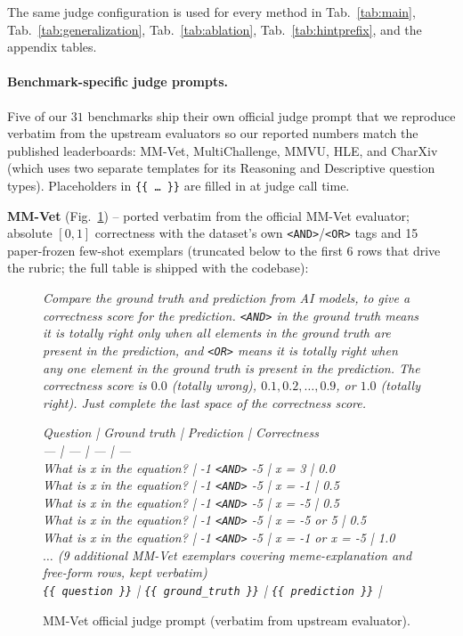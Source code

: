 The same judge configuration is used for every method in Tab.~\ref{tab:main}, Tab.~\ref{tab:generalization}, Tab.~\ref{tab:ablation}, Tab.~\ref{tab:hintprefix}, and the appendix tables.

\paragraph{Benchmark-specific judge prompts.}
Five of our $31$ benchmarks ship their own official judge prompt that we reproduce verbatim from the upstream evaluators so our reported numbers match the published leaderboards: MM-Vet, MultiChallenge, MMVU, HLE, and CharXiv (which uses two separate templates for its Reasoning and Descriptive question types). Placeholders in \texttt{\{\{\,\dots\,\}\}} are filled in at judge call time.

\textbf{MM-Vet} (Fig.~\ref{fig:prompt-judge-mmvet}) -- ported verbatim from the official MM-Vet evaluator; absolute $[0,1]$ correctness with the dataset's own \texttt{<AND>}/\texttt{<OR>} tags and 15 paper-frozen few-shot exemplars (truncated below to the first 6 rows that drive the rubric; the full table is shipped with the codebase):
\begin{figure}[!htbp]
\begin{prompttemplatefig}
\small
\emph{Compare the ground truth and prediction from AI models, to give a correctness score for the prediction. \texttt{<AND>} in the ground truth means it is totally right only when all elements in the ground truth are present in the prediction, and \texttt{<OR>} means it is totally right when any one element in the ground truth is present in the prediction. The correctness score is $0.0$ (totally wrong), $0.1, 0.2, \dots, 0.9$, or $1.0$ (totally right). Just complete the last space of the correctness score.}

\emph{Question | Ground truth | Prediction | Correctness}\\
\emph{--- | --- | --- | ---}\\
\emph{What is x in the equation? | -1 \texttt{<AND>} -5 | x = 3 | 0.0}\\
\emph{What is x in the equation? | -1 \texttt{<AND>} -5 | x = -1 | 0.5}\\
\emph{What is x in the equation? | -1 \texttt{<AND>} -5 | x = -5 | 0.5}\\
\emph{What is x in the equation? | -1 \texttt{<AND>} -5 | x = -5 or 5 | 0.5}\\
\emph{What is x in the equation? | -1 \texttt{<AND>} -5 | x = -1 or x = -5 | 1.0}\\
\emph{$\dots$ (9 additional MM-Vet exemplars covering meme-explanation and free-form rows, kept verbatim)}\\
\emph{\texttt{\{\{ question \}\}} | \texttt{\{\{ ground\_truth \}\}} | \texttt{\{\{ prediction \}\}} |}
\end{prompttemplatefig}
\caption{MM-Vet official judge prompt (verbatim from upstream evaluator).}
\label{fig:prompt-judge-mmvet}
\end{figure}

